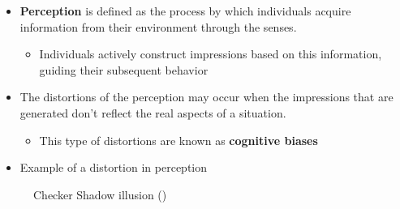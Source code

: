 \documentclass[
  ignorenonframetext,
]{beamer}
\providecommand{\tightlist}{%
  \setlength{\itemsep}{0pt}\setlength{\parskip}{0pt}}\usepackage{longtable,booktabs,array}
\begin{document}
\begin{frame}{}
\label{section-2}
\begin{itemize}
\item
  \textbf{Perception} is defined as the process by which individuals
  acquire information from their environment through the senses.

  \begin{itemize}
  \tightlist
  \item
    Individuals actively construct impressions based on this
    information, guiding their subsequent behavior
  \end{itemize}
\item
  The distortions of the perception may occur when the impressions that
  are generated don't reflect the real aspects of a situation.

  \begin{itemize}
  \tightlist
  \item
    This type of distortions are known as \textbf{cognitive biases}
  \end{itemize}
\end{itemize}
\end{frame}

\begin{frame}{}
\label{section-3}
\begin{itemize}
\tightlist
\item
  Example of a distortion in perception
\end{itemize}

\begin{figure}


\caption{\label{fig-checker-shadow-illusion}Checker Shadow illusion
()}

\end{figure}%
\end{frame}
\end{document}
